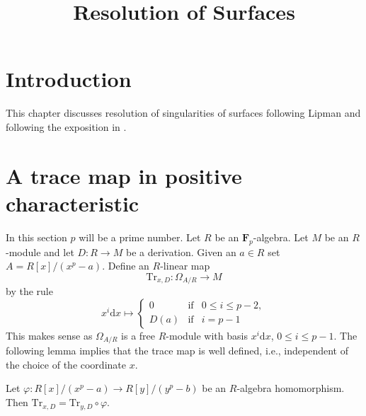 

%


\title{Resolution of Surfaces}


\maketitle

\label{section-phantom}

\tableofcontents

\section{Introduction}
\label{section-introduction}

\noindent
This chapter discusses resolution of singularities of surfaces
following Lipman \cite{Lipman} and following the exposition
in \cite{Artin-Lipman}.





\section{A trace map in positive characteristic}
\label{section-trace}

\noindent
In this section $p$ will be a prime number. Let $R$ be an
$\mathbf{F}_p$-algebra. Let $M$ be an $R$-module and let $D : R \to M$ be a
derivation. Given an $a \in R$ set $A = R[x]/(x^p - a)$.
Define an $R$-linear map
$$
\text{Tr}_{x, D} : \Omega_{A/R} \longrightarrow M
$$
by the rule
$$
x^i\text{d}x \longmapsto
\left\{
\begin{matrix}
0 & \text{if} & 0 \leq i \leq p - 2, \\
D(a) & \text{if} & i = p - 1
\end{matrix}
\right.
$$
This makes sense as $\Omega_{A/R}$ is a free $R$-module with
basis $x^i\text{d}x$, $0 \leq i \leq p - 1$.
The following lemma implies that the trace map is well defined,
i.e., independent of the choice of the coordinate $x$.

\begin{lemma}
\label{lemma-trace-well-defined}
Let $\varphi : R[x]/(x^p - a) \to R[y]/(y^p - b)$ be an $R$-algebra
homomorphism. Then
$\text{Tr}_{x, D} = \text{Tr}_{y, D} \circ \varphi$.
\end{lemma}

